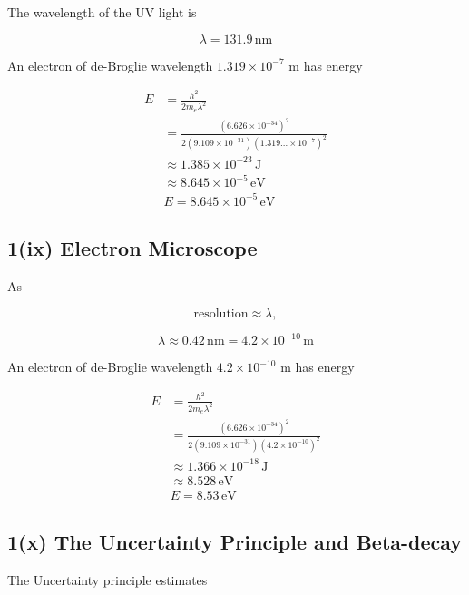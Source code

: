 \documentclass{article}
\begin{document}
The wavelength of the UV light is

\begin{equation*}
\boxed{\lambda = 131.9 \,\mathrm{nm}}
\end{equation*}

An electron of de-Broglie wavelength $1.319 \times 10^{-7}$ m has energy

\begin{align*}
E &= \frac{h^2}{2m_e\lambda^2} \\
&= \frac{(6.626 \times 10^{-34})^2}{2(9.109 \times 10^{-31})(1.319... \times 10^{-7})^2} \\
&\approx 1.385 \times 10^{-23} \,\mathrm{J} \\
&\approx 8.645 \times 10^{-5} \,\mathrm{eV} \\
&\boxed{E = 8.645 \times 10^{-5} \,\mathrm{eV}}
\end{align*}


\subsection*{1(ix) Electron Microscope}

As

\begin{equation*}
\text{resolution} \approx \lambda,
\end{equation*}

\begin{equation*}
\lambda \approx 0.42 \,\mathrm{nm} = 4.2 \times 10^{-10} \,\mathrm{m}
\end{equation*}

An electron of de-Broglie wavelength $4.2 \times 10^{-10}$ m has energy

\begin{align*}
E &= \frac{h^2}{2m_e\lambda^2} \\
&= \frac{(6.626 \times 10^{-34})^2}{2(9.109 \times 10^{-31})(4.2 \times 10^{-10})^2} \\
&\approx 1.366 \times 10^{-18} \,\mathrm{J} \\
&\approx 8.528 \,\mathrm{eV} \\
&\boxed{E = 8.53 \,\mathrm{eV}}
\end{align*}


\subsection*{1(x) The Uncertainty Principle and Beta-decay}

The Uncertainty principle estimates
\end{document}

